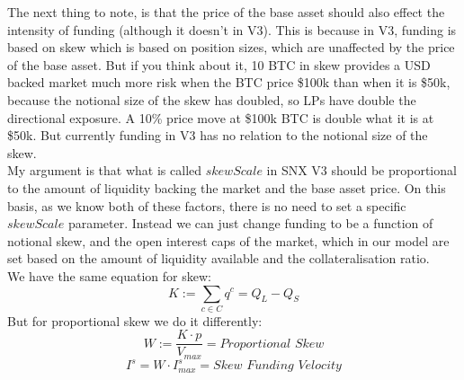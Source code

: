\documentclass[]{article}
\begin{document}
The next thing to note, is that the price of the base asset should also effect the intensity of funding (although it doesn't in V3). This is because in V3, funding is based on skew which is based on position sizes, which are unaffected by the price of the base asset. But if you think about it, 10 BTC in skew provides a USD backed market much more risk when the BTC price \$100k than when it is \$50k, because the notional size of the skew has doubled, so LPs have double the directional exposure. A 10\% price move at \$100k BTC is double what it is at \$50k. But currently funding in V3 has no relation to the notional size of the skew.\\

My argument is that what is called $skewScale$ in SNX V3 should be proportional to the amount of liquidity backing the market and the base asset price. On this basis, as we know both of these factors, there is no need to set a specific $skewScale$ parameter. Instead we can just change funding to be a function of notional skew, and the open interest caps of the market, which in our model are set based on the amount of liquidity available and the collateralisation ratio.\\

We have the same equation for skew:
\begin{equation}
K := \sum_{c \in C}{q^c} = Q_L - Q_S
\end{equation}
But for proportional skew we do it differently:
\begin{equation}
W := \frac{K \cdot p}{V_{max}} = \textit{Proportional Skew}
\end{equation}
\begin{equation}
I^s = W \cdot I^s_{max} = \textit{Skew Funding Velocity}
\end{equation}
\end{document}
